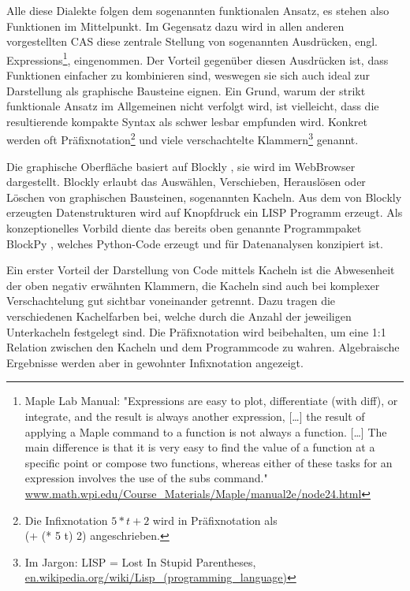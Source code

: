 \documentclass[twocolumn, 10pt]{article}
\begin{document}
Alle diese Dialekte folgen dem sogenannten funktionalen Ansatz, es stehen also Funktionen im Mittelpunkt. Im Gegensatz dazu wird in allen anderen vorgestellten CAS diese zentrale Stellung von sogenannten Ausdrücken, engl. Expressions\footnote{Maple Lab Manual: "Expressions are easy to plot, differentiate (with diff), or integrate, and the result is always another expression, […] the result of applying a Maple command to a function is not always a function. […] The main difference is that it is very easy to find the value of a function at a specific point or compose two functions, whereas either of these tasks for an expression involves the use of the subs command." \url{www.math.wpi.edu/Course_Materials/Maple/manual2e/node24.html}}, eingenommen. Der Vorteil gegenüber diesen Ausdrücken ist, dass Funktionen einfacher zu kombinieren sind, weswegen sie sich auch ideal zur Darstellung als graphische Bausteine eignen.  Ein Grund, warum der strikt funktionale Ansatz im Allgemeinen nicht verfolgt wird, ist vielleicht, dass die resultierende kompakte Syntax als schwer lesbar empfunden wird. Konkret werden oft  Präfixnotation\footnote{Die Infixnotation $5*t+2$ wird in Präfixnotation als \\ (+ (* 5 t) 2) angeschrieben.} und viele verschachtelte Klammern\footnote{Im Jargon: LISP = Lost In Stupid Parentheses, \url{en.wikipedia.org/wiki/Lisp_(programming_language)}} genannt.

Die graphische Oberfläche basiert auf Blockly \cite{cFraser 19}, sie wird im WebBrowser dargestellt. Blockly erlaubt das Auswählen, Verschieben, Herauslösen oder Löschen von graphischen Bausteinen, sogenannten Kacheln. Aus dem von Blockly erzeugten Datenstrukturen wird auf Knopfdruck ein LISP Programm erzeugt. Als konzeptionelles Vorbild diente das bereits oben genannte Programmpaket  BlockPy \cite{cBartStudy 20}, welches Python-Code erzeugt und für Datenanalysen konzipiert ist.

Ein erster Vorteil der Darstellung von Code mittels Kacheln ist die Abwesenheit der oben negativ erwähnten Klammern, die Kacheln sind auch bei komplexer Verschachtelung gut sichtbar voneinander getrennt. Dazu tragen die verschiedenen Kachelfarben bei, welche durch die Anzahl der jeweiligen Unterkacheln festgelegt sind. Die Präfixnotation wird beibehalten, um eine 1:1 Relation zwischen den Kacheln und dem Programmcode zu wahren. Algebraische Ergebnisse werden aber in gewohnter Infixnotation angezeigt.
\end{document}
